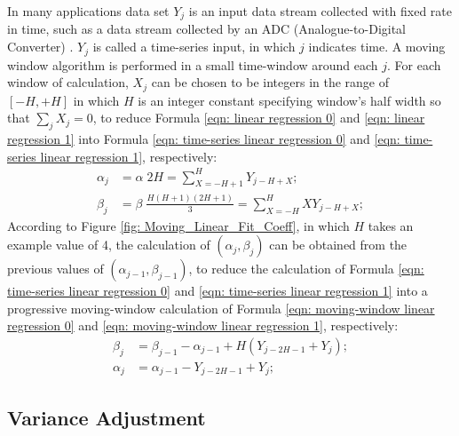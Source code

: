 \documentclass[twoside]{article}
\numberwithin{equation}{section}
\begin{document}
In many applications data set ${Y_j}$ is an input data stream collected with fixed rate in time, such as a data stream collected by an ADC (Analogue-to-Digital Converter) \cite{Electronics}.  ${Y_j}$ is called a time-series input, in which $j$ indicates time.  A moving window algorithm \cite{Numerical_Recipes} is performed in a small time-window around each $j$.  For each window of calculation, ${X_j}$ can be chosen to be integers in the range of $[-H, +H]$ in which $H$ is an integer constant specifying window’s half width so that $\sum_{j} X_{j} = 0$, to reduce Formula \eqref{eqn: linear regression 0} and \eqref{eqn: linear regression 1} into Formula \eqref{eqn: time-series linear regression 0} and \eqref{eqn: time-series linear regression 1}, respectively:
\begin{align}
\label{eqn: time-series linear regression 0}
\alpha _{j} &= \alpha \; 2 H = \sum_{X=-H+1}^{H} Y_{j-H+X}; \\
\label{eqn: time-series linear regression 1}
\beta _{j} &= \beta \; \frac{H (H+1)(2H+1)}{3} = \sum_{X=-H}^{H} X Y_{j-H+X}; 
\end{align}
According to Figure \ref{fig: Moving_Linear_Fit_Coeff}, in which $H$ takes an example value of 4, the calculation of $(\alpha _{j}, \beta _{j})$ can be obtained from the previous values of $(\alpha _{j-1}, \beta _{j-1})$, to reduce the calculation of Formula \eqref{eqn: time-series linear regression 0} and \eqref{eqn: time-series linear regression 1} into a progressive moving-window calculation of Formula \eqref{eqn: moving-window linear regression 0} and \eqref{eqn: moving-window linear regression 1}, respectively:
\begin{align}
\label{eqn: moving-window linear regression 0}
\beta _{j} &= \beta _{j-1} - \alpha _{j-1} + H \left(Y_{j-2H-1} + Y_{j} \right); \\
\label{eqn: moving-window linear regression 1}
\alpha_{j} &= \alpha _{j-1} - Y_{j-2H-1} + Y_{j};
\end{align}


\subsection{Variance Adjustment} 
\end{document}
